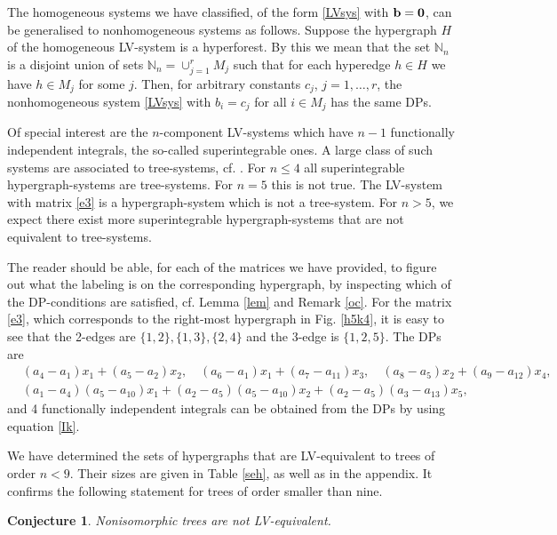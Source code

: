 \documentclass{article}
\newcounter{NN}
\newtheorem{conjecture}[NN]{Conjecture}
\def\N{\mathbb{N}}
\def\b{{\mathbf b}}
\begin{document}
The homogeneous systems we have classified, of the form \eqref{LVsys} with $\b={\bf 0}$, can be generalised to nonhomogeneous systems as follows. Suppose the hypergraph $H$ of the homogeneous LV-system is a hyperforest. By this we mean that the set $\N_n$ is a disjoint union of sets $\N_n=\cup_{j=1}^r M_j$ such that for each hyperedge $h\in H$ we have $h\in M_j$ for some $j$. Then, for arbitrary constants $c_j$, $j=1,\ldots,r$, the nonhomogeneous system \eqref{LVsys} with $b_i=c_j$ for all $i\in M_j$ has the same DPs.

Of special interest are the $n$-component LV-systems which have $n-1$ functionally independent integrals, the so-called superintegrable ones. A large class of such systems are associated to tree-systems, cf. \cite{QTMK,trees}. For $n\leq 4$ all superintegrable hypergraph-systems are tree-systems. For $n=5$ this is not true. The LV-system with matrix \eqref{e3} is a hypergraph-system which is not a tree-system. For $n>5$, we expect there exist more superintegrable hypergraph-systems that are not equivalent to tree-systems.


The reader should be able, for each of the matrices we have provided, to figure out what the labeling is on the corresponding hypergraph, by inspecting which of the DP-conditions are satisfied, cf. Lemma \ref{lem} and Remark \ref{oc}. For the matrix \eqref{e3}, which corresponds to the right-most hypergraph in Fig. \ref{h5k4}, it is easy to see
that the 2-edges are $\{1,2\},\{1,3\},\{2,4\}$ and the 3-edge is $\{1,2,5\}$. The DPs are
\begin{align*}
&\left(a_{4}-a_{1}\right) x_{1}+\left(a_{5}-a_{2}\right) x_{2},\quad
\left(a_{6}-a_{1}\right) x_{1}+\left(a_{7}-a_{11}\right) x_{3},\quad
\left(a_{8}-a_{5}\right) x_{2}+\left(a_{9}-a_{12}\right) x_{4},\\
&\left(a_{1}-a_{4}\right)\left(a_{5}-a_{10}\right)x_{1}
+\left(a_{2}-a_{5}\right)\left(a_{5}-a_{10}\right)x_{2}
+\left(a_{2}-a_{5}\right)\left(a_{3}-a_{13}\right)x_{5},
\end{align*}
and 4 functionally independent integrals can be obtained from the DPs by using equation \eqref{Ik}.

We have determined the sets of hypergraphs that are LV-equivalent to trees of order $n<9$. Their sizes are given in Table \ref{seh}, as well as in the appendix. It confirms the following statement for trees of order smaller than nine.
\begin{conjecture}
Nonisomorphic trees are not LV-equivalent.
\end{conjecture}
\end{document}
